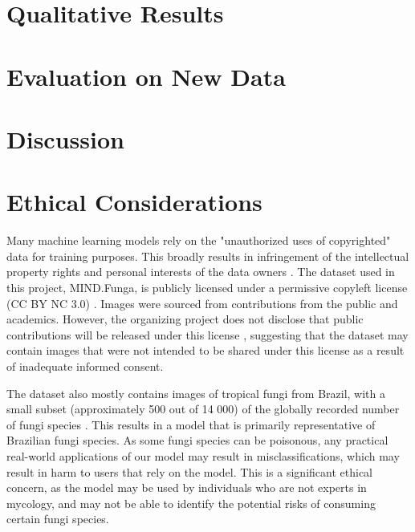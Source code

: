 \documentclass{article} %
\begin{document}
\section{Qualitative Results}
\label{sec:qualitative_results}

\section{Evaluation on New Data}
\label{sec:evaluation}

\section{Discussion}
\label{sec:discussion}

\section{Ethical Considerations}
\label{sec:ethics}
Many machine learning models rely on the "unauthorized uses of copyrighted" data for training purposes. This broadly results in infringement of the intellectual property rights and personal interests of the data owners \citep{Sobel.TaxonomyTrainingData.2021}. The dataset used in this project, MIND.Funga, is publicly licensed under a permissive copyleft license (CC BY NC 3.0) \citep{Drechsler-SantosKarstedtEtAl.MINDFunga.2023}. Images were sourced from contributions from the public and academics. However, the organizing project does not disclose that public contributions will be released under this license \citep{Drechsler-SantosKarstedtEtAl.MINDFunga.2023}, suggesting that the dataset may contain images that were not intended to be shared under this license as a result of inadequate informed consent.

The dataset also mostly contains images of tropical fungi from Brazil, with a small subset (approximately 500 out of 14 000) of the globally recorded number of fungi species \citep{LuckingAimeEtAl.UnambiguousIdentificationFungi.2020}. This results in a model that is primarily representative of Brazilian fungi species. As some fungi species can be poisonous, any practical real-world applications of our model may result in misclassifications, which may result in harm to users that rely on the model. This is a significant ethical concern, as the model may be used by individuals who are not experts in mycology, and may not be able to identify the potential risks of consuming certain fungi species.

\label{last_page}



\end{document}
